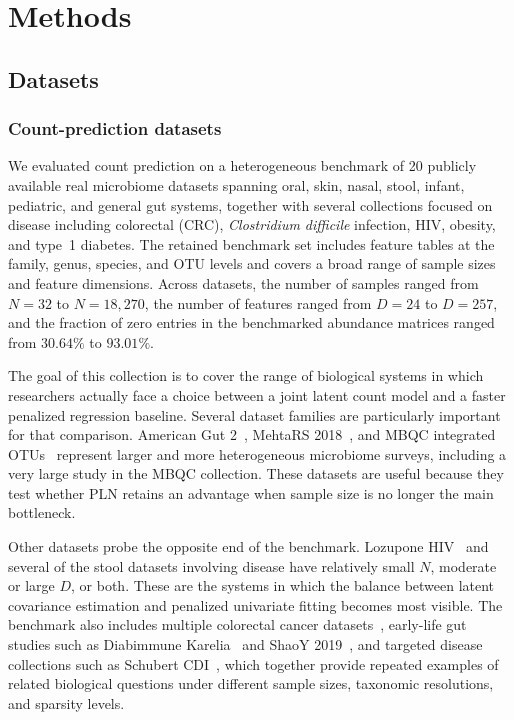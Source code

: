 \documentclass[USenglish]{article}
\theoremstyle{dgthm}
\begin{document}
\section{Methods}
\subsection{Datasets}
\subsubsection{Count-prediction datasets}
\label{subsec:count-prediction-datasets}
We evaluated count prediction on a heterogeneous benchmark of 20 publicly available real microbiome datasets spanning oral, skin, nasal, stool, infant, pediatric, and general gut systems, together with several collections focused on disease including colorectal (CRC), \textit{Clostridium difficile} infection, HIV, obesity, and type~1 diabetes.
The retained benchmark set includes feature tables at the family, genus, species, and OTU levels and covers a broad range of sample sizes and feature dimensions.
Across datasets, the number of samples ranged from $N=32$ to $N=18{,}270$, the number of features ranged from $D=24$ to $D=257$, and the fraction of zero entries in the benchmarked abundance matrices ranged from $30.64\%$ to $93.01\%$.

The goal of this collection is to cover the range of biological systems in which researchers actually face a choice between a joint latent count model and a faster penalized regression baseline.
Several dataset families are particularly important for that comparison.
American Gut 2~\citep{McDonald2018}, MehtaRS 2018~\citep{Mehta2018}, and MBQC integrated OTUs~\citep{MBQC2017} represent larger and more heterogeneous microbiome surveys, including a very large study in the MBQC collection.
These datasets are useful because they test whether PLN retains an advantage when sample size is no longer the main bottleneck.

Other datasets probe the opposite end of the benchmark.
Lozupone HIV~\citep{Lozupone2013} and several of the stool datasets involving disease have relatively small $N$, moderate or large $D$, or both.
These are the systems in which the balance between latent covariance estimation and penalized univariate fitting becomes most visible.
The benchmark also includes multiple colorectal cancer datasets~\citep{Wang2012, Zeller2014}, early-life gut studies such as Diabimmune Karelia~\citep{Vatanen2016} and ShaoY 2019~\citep{Shao2019}, and targeted disease collections such as Schubert CDI~\citep{Schubert2014}, which together provide repeated examples of related biological questions under different sample sizes, taxonomic resolutions, and sparsity levels.
\end{document}
